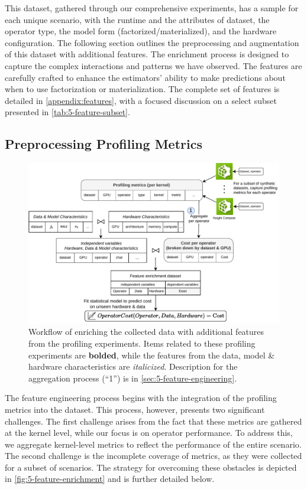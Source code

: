 This dataset, gathered through our comprehensive experiments, has a sample for each unique scenario, with the runtime and the attributes of dataset, the operator type, the model form (factorized/materialized), and the hardware configuration. The following section outlines the preprocessing and augmentation of this dataset with additional features. The enrichment process is designed to capture the complex interactions and patterns we have observed. The features are carefully crafted to enhance the estimators' ability to make predictions about when to use factorization or materialization. The complete set of features is detailed in \autoref{appendix:features}, with a focused discussion on a select subset presented in \autoref{tab:5-feature-subset}.

\subsection{Preprocessing Profiling Metrics}
\begin{figure}[ht]
    \centering
    \includegraphics[width=\linewidth]{chapters/05_cost_estimation/figures/feature-engineering.pdf}
    \caption[Feature enrichment workflow]{Workflow of enriching the collected data with additional features from the profiling experiments. Items related to these profiling experiments are \textbf{bolded}, while the features from the data, model \& hardware characteristics are \textit{italicized}. Description for the aggregation process (“1”) is in \autoref{sec:5-feature-engineering}.}
    \label{fig:5-feature-enrichment}
\end{figure}
The feature engineering process begins with the integration of the profiling metrics into the dataset. This process, however, presents two significant challenges. The first challenge arises from the fact that these metrics are gathered at the kernel level, while our focus is on operator performance. To address this, we aggregate kernel-level metrics to reflect the performance of the entire scenario. The second challenge is the incomplete coverage of metrics, as they were collected for a subset of scenarios. The strategy for overcoming these obstacles is depicted in \autoref{fig:5-feature-enrichment} and is further detailed below.

